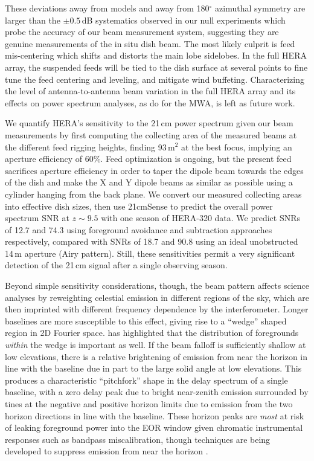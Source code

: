 These deviations away from models and away from 180$^\circ$ azimuthal symmetry are larger than the $\pm0.5$\,dB systematics observed in our null experiments which probe the accuracy of our beam measurement system, suggesting they are genuine measurements of the in situ dish beam. The most likely culprit is feed mis-centering which shifts and distorts the main lobe sidelobes. In the full HERA array, the suspended feeds will be tied to the dish surface at several points to fine tune the feed centering and leveling, and mitigate wind buffeting. Characterizing the level of antenna-to-antenna beam variation in the full HERA array and its effects on power spectrum analyses, as \citet{neben16} do for the MWA, is left as future work.

We quantify HERA's sensitivity to the 21\,cm power spectrum given our beam measurements by first computing the collecting area of the measured beams at the different feed rigging heights, finding 93\,m$^2$ at the best focus, implying an aperture efficiency of 60\%. Feed optimization is ongoing, but the present feed sacrifices aperture efficiency in order to taper the dipole beam towards the edges of the dish and make the X and Y dipole beams as similar as possible using a cylinder hanging from the back plane. We convert our measured collecting areas into effective dish sizes, then use 21cmSense to predict the overall power spectrum SNR at $z\sim9.5$ with one season of HERA-320 data. We predict SNRs of 12.7 and 74.3 using foreground avoidance and subtraction approaches respectively, compared with SNRs of 18.7 and 90.8 using an ideal unobstructed 14\,m aperture (Airy pattern). Still, these sensitivities permit a very significant detection of the 21\,cm signal after a single observing season.

Beyond simple sensitivity considerations, though, the beam pattern affects science analyses by reweighting celestial emission in different regions of the sky, which are then imprinted with different frequency dependence by the interferometer. Longer baselines are more susceptible to this effect, giving rise to a ``wedge'' shaped region in 2D Fourier space. \citet{nithya15} has highlighted that the distribution of foregrounds \textit{within} the wedge is important as well. If the beam falloff is sufficiently shallow at low elevations, there is a relative brightening of emission from near the horizon in line with the baseline due in part to the large solid angle at low elevations. This produces a characteristic ``pitchfork'' shape in the delay spectrum of a single baseline, with a zero delay peak due to bright near-zenith emission surrounded by tines at the negative and positive horizon limits due to emission from the two horizon directions in line with the baseline. These horizon peaks are \textit{most} at risk of leaking foreground power into the EOR window given chromatic instrumental responses such as bandpass miscalibration, though techniques are being developed to suppress emission from near the horizon \citep{parsonsoptimalfringeratefiltering}.


